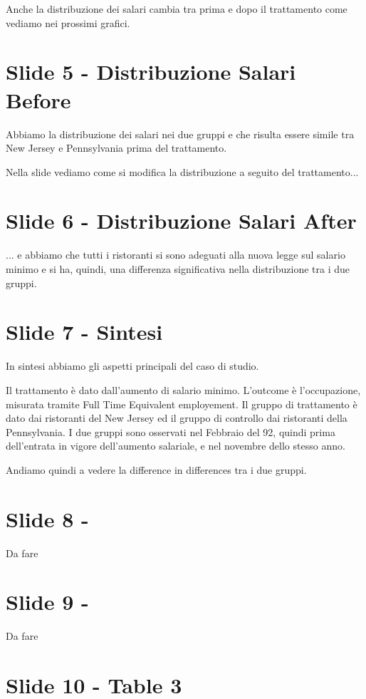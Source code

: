 \documentclass{article}
\begin{document}
Anche la distribuzione dei salari cambia tra prima e dopo il trattamento come vediamo nei prossimi grafici.

\section{Slide 5 - Distribuzione Salari Before}

Abbiamo la distribuzione dei salari nei due gruppi e che risulta essere simile tra New Jersey e Pennsylvania prima del trattamento.

Nella slide vediamo come si modifica la distribuzione a seguito del trattamento...


\section{Slide 6 - Distribuzione Salari After}

... e abbiamo che tutti i ristoranti si sono adeguati alla nuova legge sul salario minimo e si ha, quindi, una differenza significativa nella distribuzione tra i due gruppi.

\section{Slide 7 - Sintesi} 

In sintesi abbiamo gli aspetti principali del caso di studio.

Il trattamento è dato dall'aumento di salario minimo. L'outcome è l'occupazione, misurata tramite Full Time Equivalent employement. Il gruppo di trattamento è dato dai ristoranti del New Jersey ed il gruppo di controllo dai ristoranti della Pennsylvania. I due gruppi sono osservati nel Febbraio del 92, quindi prima dell'entrata in vigore dell'aumento salariale, e nel novembre dello stesso anno.

Andiamo quindi a vedere la difference in differences tra i due gruppi.

\section{Slide 8 - }

Da fare

\section{Slide 9 - }

Da fare

\section{Slide 10 - Table 3}
\end{document}
